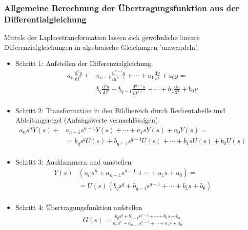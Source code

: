 \subsubsection{Allgemeine Berechnung der Übertragungsfunktion aus der Differentialgleichung}
%
Mittels der Laplacetransformation lassen sich gewöhnliche lineare Differenzialgleichungen in algebraische Gleichungen 'umwandeln'. 
\begin{itemize}
\item Schritt 1: Aufstellen der Differenzialgleichung.
%
\begin{equation*}
\begin{aligned}
a_{n}\frac{\text{d}^{n}y}{\text{d}t^{n}}+&a_{n-1}\frac{\text{d}^{n-1}y}{\text{d}t^{n-1}}+\cdots+a_{1}\frac{\text{d}y}{\text{d}t}+a_{0}y=\\
&b_{q}\frac{\text{d}^{q}u}{\text{d}t^{q}}+b_{q-1}\frac{\text{d}^{q-1}u}{\text{d}t^{q-1}}+\cdots+b_{1}\frac{\text{d}u}{\text{d}t}+b_{0}u\\
\end{aligned}
\end{equation*}
%
\item Schritt 2: Transformation in den Bildbereich durch Rechentabelle und Ableitungsregel (Anfangswerte vernachlässigen).
%
\begin{equation*}
\begin{aligned}
a_{n}s^{n}Y(s)+&a_{n-1}s^{n-1}Y(s)+\cdots+a_{1}sY(s)+a_{0}Y(s)=\\
&=b_{q}s^{q}U(s)+b_{q-1}s^{q-1}U(s)+\cdots+b_{1}sU(s)+b_{0}U(s)\\
\end{aligned}
\end{equation*}
%
\item Schritt 3: Ausklammern und umstellen
%
\begin{equation*}
\begin{aligned}
Y(s)&\left(a_{n}s^{n}+a_{n-1}s^{n-1}+\cdots+a_{1}s+a_{0}\right)=\\
&=U(s)\left(b_{q}s^{q}+b_{q-1}s^{q-1}+\cdots+b_{1}s+b_{0}\right)\\
\end{aligned}
\end{equation*}
%
%
\item Schritt 4: Übertragungsfunktion aufstellen
%
\begin{equation*}
\begin{aligned}
G(s)=\frac{b_{q}s^{q}+b_{q-1}s^{q-1}+\cdots+b_{1}s+b_{0}}{a_{n}s^{n}+a_{n-1}s^{n-1}+\cdots+a_{1}s+a_{0}}\\
\end{aligned}
\end{equation*}
%
\end{itemize}
%
